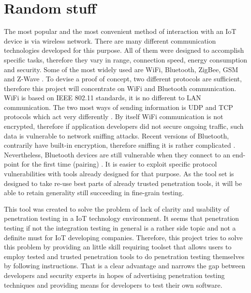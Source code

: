 \section{Random stuff}

The most popular and the most convenient method of interaction with an IoT device is via wireless network. There are many different communication technologies developed for this purpose. All of them were designed to accomplish specific tasks, therefore they vary in range, connection speed, energy consumption and security. Some of the most widely used are WiFi, Bluetooth, ZigBee, GSM and Z-Wave \cite{cookbook}. To devise a proof of concept, two different protocols are sufficient, therefore this project will concentrate on WiFi and Bluetooth communication. WiFi is based on IEEE 802.11 standards, it is no different to LAN communication. The two most ways of sending information is UDP and TCP protocols which act very differently \cite{4359944}. By itself WiFi communication is not encrypted, therefore if application developers did not secure ongoing traffic, such data is vulnerable to network sniffing attacks. Recent versions of Bluetooth, contrarily have built-in encryption, therefore sniffing it is rather complicated \cite{scarfone2012guide}. Nevertheless, Bluetooth devices are still vulnerable when they connect to an end-point for the first time (pairing) \cite{scarfone2012guide}. It is easier to exploit specific protocol vulnerabilities with tools already designed for that purpose. As the tool set is designed to take re-use best parts of already trusted penetration tools, it will be able to retain generality still succeeding in fine-grain testing.



This tool was created to solve the problem of lack of clarity and usability of penetration testing in a IoT technology environment. It seems that penetration testing if not the integration testing in general is a rather side topic and not a definite must for IoT developing companies. Therefore, this project tries to solve this problem by providing an little skill requiring toolset that allows users to employ tested and trusted penetration tools to do penetration testing themselves by following instructions. That is a clear advantage and narrows the gap between developers and security experts in hopes of advertising penetration testing techniques and providing means for developers to test their own software.